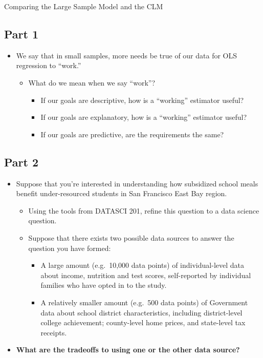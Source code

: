 \documentclass[
  letterpaper,
  DIV=11,
  numbers=noendperiod]{scrreprt}
\providecommand{\tightlist}{%
  \setlength{\itemsep}{0pt}\setlength{\parskip}{0pt}}\usepackage{longtable,booktabs,array}
\begin{document}
Comparing the Large Sample Model and the CLM

\subsection{Part 1}\label{part-1-1}

\begin{itemize}
\tightlist
\item
  We say that in small samples, more needs be true of our data for OLS
  regression to ``work.''

  \begin{itemize}
  \tightlist
  \item
    What do we mean when we say ``work''?

    \begin{itemize}
    \tightlist
    \item
      If our goals are descriptive, how is a ``working'' estimator
      useful?
    \item
      If our goals are explanatory, how is a ``working'' estimator
      useful?
    \item
      If our goals are predictive, are the requirements the same?
    \end{itemize}
  \end{itemize}
\end{itemize}

\subsection{Part 2}\label{part-2-1}

\begin{itemize}
\tightlist
\item
  Suppose that you're interested in understanding how subsidized school
  meals benefit under-resourced students in San Francisco East Bay
  region.

  \begin{itemize}
  \tightlist
  \item
    Using the tools from DATASCI 201, refine this question to a data
    science question.
  \item
    Suppose that there exists two possible data sources to answer the
    question you have formed:

    \begin{itemize}
    \tightlist
    \item
      A large amount (e.g.~10,000 data points) of individual-level data
      about income, nutrition and test scores, self-reported by
      individual families who have opted in to the study.\\
    \item
      A relatively smaller amount (e.g.~500 data points) of Government
      data about school district characteristics, including
      district-level college achievement; county-level home prices, and
      state-level tax receipts.
    \end{itemize}
  \end{itemize}
\item
  \textbf{What are the tradeoffs to using one or the other data
  source?}\\
\end{itemize}
\end{document}
